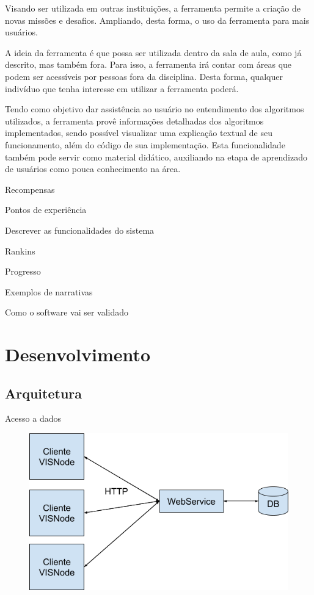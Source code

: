 \documentclass[
	12pt,				%
	oneside,			%
	a4paper,			%
	english,			%
	french,				%
	spanish,			%
	brazil,				%
	]{abntex2}
\begin{document}
Visando ser utilizada em outras instituições, a ferramenta permite a criação de novas missões e desafios. Ampliando, desta forma, o uso da ferramenta para mais usuários.

A ideia da ferramenta é que possa ser utilizada dentro da sala de aula, como já descrito, mas também fora. Para isso, a ferramenta irá contar com áreas que podem ser acessíveis por pessoas fora da disciplina. Desta forma, qualquer indivíduo que tenha interesse em utilizar a ferramenta poderá.

Tendo como objetivo dar assistência ao usuário no entendimento dos algoritmos utilizados, a ferramenta provê informações detalhadas dos algoritmos implementados, sendo possível visualizar uma explicação textual de seu funcionamento, além do código de sua implementação. Esta funcionalidade também pode servir como material didático, auxiliando na etapa de aprendizado de usuários como pouca conhecimento na área.

Recompensas

Pontos de experiência

Descrever as funcionalidades do sistema

Rankins

Progresso

Exemplos de narrativas

Como o software vai ser validado

\chapter{Desenvolvimento} 


\section{Arquitetura}
Acesso a dados

\begin{figure}[ht]
\centering
\includegraphics[width=1\textwidth]{imagens/visnode_arquitetura.png}
\end{figure}
\end{document}
